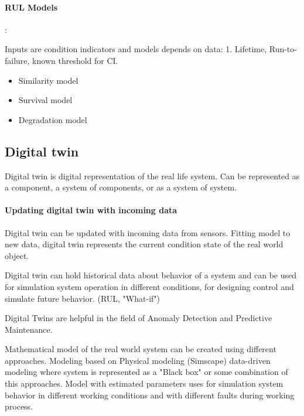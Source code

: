 \documentclass[class=article, crop=false]{standalone}
\begin{document}
\paragraph{RUL Models}:

Inputs are condition indicators and models depends on data: 1. Lifetime,
Run-to-failure, known threshold for CI.

\begin{itemize}
    \item Similarity model 
    \item Survival model
    \item Degradation model
\end{itemize}


\subsection{Digital twin}

Digital twin is digital representation of the real life system. Can be
represented as a component, a system of components, or as a system of
system.  

\paragraph{Updating digital twin with incoming data} 

Digital twin can be updated with incoming data from sensors. Fitting model
to new data, digital twin represents the current condition state of the
real world object.

Digital twin can hold historical data about behavior of a system
and can be used for simulation system operation in different conditions,
for designing control and simulate future behavior. (RUL, "What-if")

Digital Twins are helpful in the field of Anomaly Detection and Predictive
Maintenance.

Mathematical model of the real world system can be created using different
approaches. Modeling based on Physical modeling (Simscape) data-driven
modeling where system is represented as a "Black box" or some combination
of this approaches.
Model with estimated parameters uses for simulation system behavior in
different working conditions and with different faults during working
process.
\end{document}
